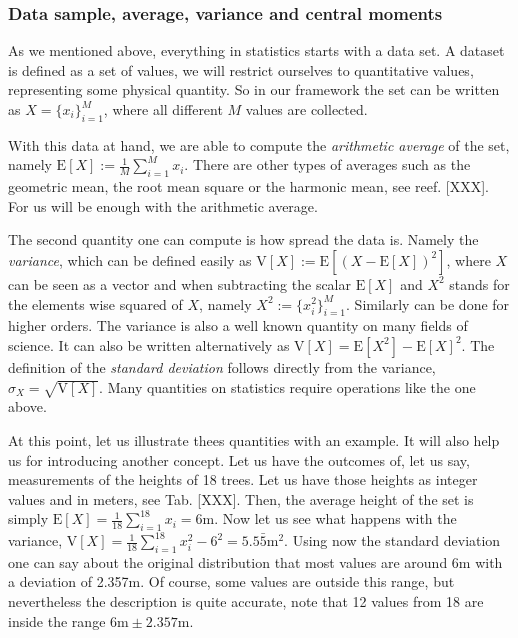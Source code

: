 \subsubsection{Data sample, average, variance and central moments}

As we mentioned above, everything in statistics starts with a data set.
A dataset is defined as a set of values, we will restrict ourselves to quantitative values, representing some physical quantity.
So in our framework the set can be written as $X=\{x_i\}_{i=1}^M$, where all different $M$ values are collected.

With this data at hand, we are able to compute the \emph{arithmetic average} of the set, namely $\text{E}[X] := \frac{1}{M}\sum_{i=1}^M x_i$.
There are other types of averages such as the geometric mean, the root mean square or the harmonic mean, see reef. [XXX].
For us will be enough with the arithmetic average.

The second quantity one can compute is how spread the data is.
Namely the \emph{variance}, which can be defined easily as $\text{V}[X] := \text{E}[(X- \text{E}[X])^2]$, where $X$ can be seen as a vector and when subtracting the scalar $\text{E}[X]$ and $X^2$ stands for the elements wise squared of $X$, namely $X^2 := \{x_i^2\}_{i=1}^M$.
Similarly can be done for higher orders.
The variance is also a well known quantity on many fields of science.
It can also be written alternatively as $\text{V}[X] = \text{E}[X^2]- \text{E}[X]^2$.
The definition of the \emph{standard deviation} follows directly from the variance, $\sigma_{X}=\sqrt{\text{V}[X]}$.
Many quantities on statistics require operations like the one above.

At this point, let us illustrate thees quantities with an example.
It will also help us for introducing another concept.
Let us have the outcomes of, let us say, measurements of the heights of 18 trees.
Let us have those heights as integer values and in meters, see Tab. [XXX].
Then, the average height of the set is simply $\text{E}[X] = \frac{1}{18}\sum_{i=1}^{18} x_i = 6\text{m}$. Now let us see what happens with the variance, $\text{V}[X]=\frac{1}{18}\sum_{i=1}^{18}x_i^2 - 6^2 = 5.5\bar{5}\text{m}^2$.
Using now the standard deviation one can say about the original distribution that most values are around 6m with a deviation of 2.357m. Of course, some values are outside this range, but nevertheless the description is quite accurate, note that 12 values from 18 are inside the range $6\text{m}\pm2.357\text{m}$.

